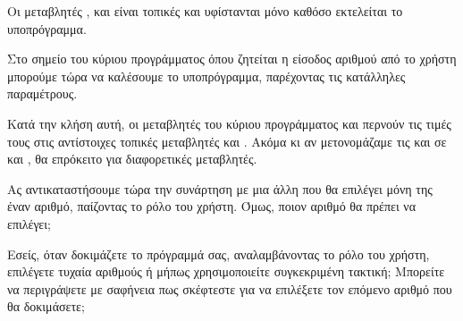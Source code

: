 \documentclass[a4paper,11pt,oneside]{book}
\begin{document}
Οι μεταβλητές ,  και  είναι τοπικές και υφίστανται μόνο καθόσο εκτελείται το υποπρόγραμμα. 

Στο σημείο του κύριου προγράμματος όπου ζητείται η είσοδος αριθμού από το χρήστη μπορούμε τώρα να καλέσουμε το υποπρόγραμμα, παρέχοντας τις κατάλληλες παραμέτρους.


Κατά την κλήση αυτή, οι μεταβλητές του κύριου προγράμματος  και  περνούν τις τιμές τους στις αντίστοιχες τοπικές μεταβλητές  και . Ακόμα κι αν μετονομάζαμε τις  και  σε  και , θα επρόκειτο για διαφορετικές μεταβλητές.

Ας αντικαταστήσουμε τώρα την συνάρτηση  με μια άλλη που θα επιλέγει μόνη της έναν αριθμό, παίζοντας το ρόλο του χρήστη. Όμως, ποιον αριθμό θα πρέπει να επιλέγει;

Εσείς, όταν δοκιμάζετε το πρόγραμμά σας, αναλαμβάνοντας το ρόλο του χρήστη, επιλέγετε τυχαία αριθμούς ή μήπως χρησιμοποιείτε συγκεκριμένη τακτική; %
Μπορείτε να περιγράψετε με σαφήνεια πως σκέφτεστε για να επιλέξετε τον επόμενο αριθμό που θα δοκιμάσετε; 
\end{document}
